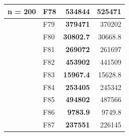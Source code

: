 \begin{table}[]
\begin{tabular}{ll|r|r|}
\multicolumn{1}{|l|}{\multirow{-39}{*}{\cellcolor[HTML]{ECF4FF}n = 200}} & \cellcolor[HTML]{FCE6AB}F78     & \cellcolor[HTML]{D3FFB6}\textbf{534844}                        & 525471                                                    \\ \hline
\multicolumn{1}{|l|}{\cellcolor[HTML]{ECF4FF}}                           & \cellcolor[HTML]{FCE6AB}F79     & \cellcolor[HTML]{D3FFB6}\textbf{379471}                        & 370202                                                    \\ \cline{2-4} 
\multicolumn{1}{|l|}{\cellcolor[HTML]{ECF4FF}}                           & \cellcolor[HTML]{FCE6AB}F80     & \cellcolor[HTML]{D3FFB6}\textbf{30802.7}                       & 30668.8                                                   \\ \cline{2-4} 
\multicolumn{1}{|l|}{\cellcolor[HTML]{ECF4FF}}                           & \cellcolor[HTML]{FCE6AB}F81     & \cellcolor[HTML]{D3FFB6}\textbf{269072}                        & 261697                                                    \\ \cline{2-4} 
\multicolumn{1}{|l|}{\cellcolor[HTML]{ECF4FF}}                           & \cellcolor[HTML]{FCE6AB}F82     & \cellcolor[HTML]{D3FFB6}\textbf{453902}                        & 441509                                                    \\ \cline{2-4} 
\multicolumn{1}{|l|}{\cellcolor[HTML]{ECF4FF}}                           & \cellcolor[HTML]{FCE6AB}F83     & \cellcolor[HTML]{D3FFB6}\textbf{15967.4}                       & 15628.8                                                   \\ \cline{2-4} 
\multicolumn{1}{|l|}{\cellcolor[HTML]{ECF4FF}}                           & \cellcolor[HTML]{FCE6AB}F84     & \cellcolor[HTML]{D3FFB6}\textbf{253405}                        & 245342                                                    \\ \cline{2-4} 
\multicolumn{1}{|l|}{\cellcolor[HTML]{ECF4FF}}                           & \cellcolor[HTML]{FCE6AB}F85     & \cellcolor[HTML]{D3FFB6}\textbf{494802}                        & 487566                                                    \\ \cline{2-4} 
\multicolumn{1}{|l|}{\cellcolor[HTML]{ECF4FF}}                           & \cellcolor[HTML]{FCE6AB}F86     & \cellcolor[HTML]{D3FFB6}\textbf{9783.9}                        & 9749.8                                                    \\ \cline{2-4} 
\multicolumn{1}{|l|}{\cellcolor[HTML]{ECF4FF}}                           & \cellcolor[HTML]{FCE6AB}F87     & \cellcolor[HTML]{D3FFB6}\textbf{237551}                        & 226145                                                    \\ \cline{2-4} 

\end{tabular}
\end{table}
